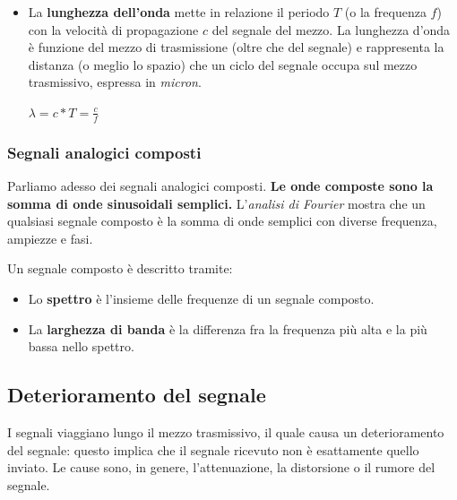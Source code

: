 \begin{itemize}
            \item
                La \textbf{lunghezza dell'onda} mette in relazione il periodo \(T\) (o la frequenza \(f\)) con la velocità di propagazione \(c\) del segnale del mezzo. La lunghezza d'onda è funzione del mezzo di trasmissione (oltre che del segnale) e rappresenta la distanza (o meglio lo spazio) che un ciclo del segnale occupa sul mezzo trasmissivo, espressa in \textit{micron}.
            
                \begin{center}
                    \(\lambda=c*T=\frac{c}{f}\)
                \end{center}
            \end{itemize}
            
        \subsubsection{Segnali analogici composti}
        
            Parliamo adesso dei segnali analogici composti. \textbf{Le onde composte sono la somma di onde sinusoidali semplici.} L'\textit{analisi di Fourier} mostra che un qualsiasi segnale composto è la somma di onde semplici con diverse frequenza, ampiezze e fasi.
        
            Un segnale composto è descritto tramite:
            
            \begin{itemize}
                \item
                    Lo \textbf{spettro} è l'insieme delle frequenze di un segnale composto.
                
                \item
                    La \textbf{larghezza di banda} è la differenza fra la frequenza più alta e la più bassa nello spettro.
            \end{itemize}
    
    \subsection{Deterioramento del segnale}
    
        I segnali viaggiano lungo il mezzo trasmissivo, il quale causa un deterioramento del segnale: questo implica che il segnale ricevuto non è esattamente quello inviato. Le cause sono, in genere, l'attenuazione, la distorsione o il rumore del segnale.
        
